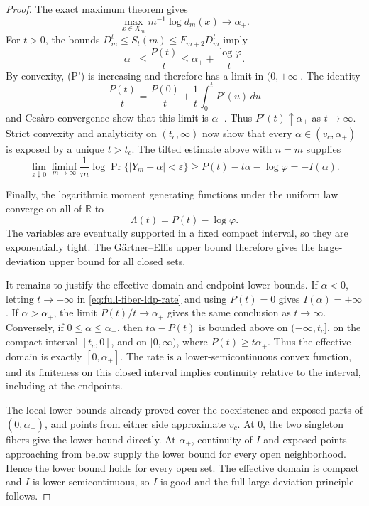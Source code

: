 \begin{proof}
The exact maximum theorem gives
\[
 \max_{x\in X_m}m^{-1}\log d_m(x)\longrightarrow\alpha_+.
\]
For \(t>0\), the bounds
\(D_m^t\le S_t(m)\le F_{m+2}D_m^t\) imply
\[
 \alpha_+\le\frac{P(t)}t
 \le\alpha_++\frac{\log\varphi}{t}.
\]
By convexity, (P') is increasing and therefore has a limit in
\((0,+\infty]\).  The identity
\[
 \frac{P(t)}t=\frac{P(0)}t+\frac1t\int_0^t P'(u)\,du
\]
and Ces\`aro convergence show that this limit is \(\alpha_+\).  Thus
\(P'(t)\uparrow\alpha_+\) as \(t\to\infty\).  Strict convexity and
analyticity on \((t_c,\infty)\) now show that every
\(\alpha\in(v_c,\alpha_+)\) is exposed by a unique \(t>t_c\).  The tilted
estimate above with \(n=m\) supplies
\begin{equation}
 \lim_{\varepsilon\downarrow0}\liminf_{m\to\infty}
 \frac1m\log\Pr\{|Y_m-\alpha|<\varepsilon\}
 \ge P(t)-t\alpha-\log\varphi=-I(\alpha).
 \label{eq:exposed-local-large-deviation}
\end{equation}

Finally, the logarithmic moment generating functions under the uniform law
converge on all of \(\mathbb R\) to
\[
 \Lambda(t)=P(t)-\log\varphi.
\]
The variables are eventually supported in a fixed compact interval, so they
are exponentially tight.  The G\"artner--Ellis upper bound
\cite[Theorem~2.3.6(a)]{DemboZeitouni2010} therefore gives the
large-deviation upper bound for all closed sets.

It remains to justify the effective domain and endpoint lower bounds.  If
\(\alpha<0\), letting \(t\to-\infty\) in
\eqref{eq:full-fiber-ldp-rate} and using \(P(t)=0\) gives
\(I(\alpha)=+\infty\).  If \(\alpha>\alpha_+\), the limit
\(P(t)/t\to\alpha_+\) gives the same conclusion as \(t\to\infty\).
Conversely, if \(0\le\alpha\le\alpha_+\), then
\(t\alpha-P(t)\) is bounded above on \(( -\infty,t_c]\), on the compact
interval \([t_c,0]\), and on \([0,\infty)\), where
\(P(t)\ge t\alpha_+\).  Thus the effective domain is exactly
\([0,\alpha_+]\).  The rate is a lower-semicontinuous convex function, and
its finiteness on this closed interval implies continuity relative to the
interval, including at the endpoints.

The local lower bounds already proved cover the coexistence and exposed
parts of \((0,\alpha_+)\), and points from either side approximate \(v_c\).
At \(0\), the two singleton fibers give the lower bound directly.  At
\(\alpha_+\), continuity of \(I\) and exposed points approaching from below
supply the lower bound for every open neighborhood.  Hence the lower bound
holds for every open set.  The effective domain is compact and \(I\) is
lower semicontinuous, so \(I\) is good and the full large deviation principle
follows.
\end{proof}

